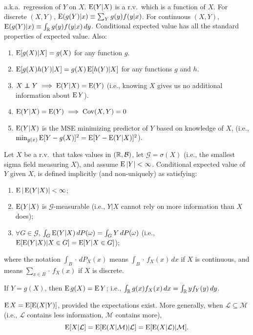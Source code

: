 \documentclass[8pt,letterpaper, landscape]{extarticle} %
\newcommand{\B}{\ensuremath{\mathcal{B}}}
\begin{document}
\begin{multicols}{3}
\begin{description}
 a.k.a.\ regression of $ Y $ on $ X $. $ \operatorname{E} (Y|X) $ is a r.v.\ which is a function of $ X $. For discrete $ (X,Y) $, $ \operatorname{E} (g(Y)|x) \equiv \sum_Y g(y) f(y|x) $. For continuous $ (X,Y) $, $ \operatorname{E} (g(Y)|x) \equiv \int_{\mathbb{R}} g(y) f(y|x) \, dy $. Conditional expected value has all the standard properties of expected value. Also:
\begin{enumerate}
\item $ \operatorname{E} [g(X) | X] = g(X) $ for any function $ g $.
\item $ \operatorname{E} [g(X) h(Y) | X] = g(X) \operatorname{E} [h(Y)|X] $ for any functions $ g $ and $ h $.
\item $ X \independent Y \implies \E (Y|X) = \E (Y) $ (i.e., knowing $ X $ gives us no additional information about $ \operatorname{E} Y $).
\item $ \operatorname{E} (Y|X) = \operatorname{E} (Y) \implies \operatorname{Cov} (X, Y) = 0  $
\item $ \operatorname{E} (Y|X) $ is the MSE minimizing predictor of $ Y $ based on knowledge of $ X $, (i.e., $ \min_{g(x)} \operatorname{E} [Y - g(X)]^{2} = \operatorname{E} [Y - \operatorname{E} (Y|X)]^{2} $).
\end{enumerate}
Let $ X $ be a r.v.\ that takes values in $ (\R, \B) $, let $ \mathcal{G} = \sigma (X) $ (i.e., the smallest sigma field measuring $ X $), and assume $ \operatorname{E} |Y| < \infty $. Conditional expected value of $ Y $ given $ X $, is defined implicitly (and non-uniquely) as satisfying:
\begin{enumerate}
\item $ \operatorname{E} | \operatorname{E} (Y|X) | < \infty $;
\item $ \operatorname{E} (Y|X) $ is $ \mathcal{G} $-measurable (i.e., $ Y|X $ cannot rely on more information than $ X $ does);
\item $ \forall G \in \mathcal{G} $, $ \int_G \operatorname{E} (Y|X) \, dP(\omega) = \int_G Y \, dP(\omega) $ (i.e., $ \operatorname{E} [ \operatorname{E} (Y|X) | X \in G] = \operatorname{E} [Y | X \in G ] $);
\end{enumerate}
where the notation $ \int_B \cdot \, dP_X(x) $ means $ \int_B  \cdot \, f_X(x) \, dx $ if $ X $ is continuous, and means $ \sum_{x \in B} \cdot \, f_X(x) $ if $ X $ is discrete.

 If $ Y = g(X) $, then $ \operatorname{E} g(X) = \operatorname{E} Y $; i.e., $ \int_{\mathbb{R}} g(x) f_X(x)\, dx = \int_{\mathbb{R}} y f_Y(y) \, dy $.

 $ \operatorname{E} X = \operatorname{E} [ \operatorname{E} (X|Y)] $, provided the expectations exist. More generally, when $ \mathcal{L} \subseteq \mathcal{M} $ (i.e., $ \mathcal{L} $ contains less information, $ \mathcal{M} $ contains more),
$$ \operatorname{E} [X | \mathcal{L} ] = \operatorname{E} [ \operatorname{E} (X | \mathcal{M} ) | \mathcal{L} ] = \operatorname{E} [ \operatorname{E} (X | \mathcal{L} ) | \mathcal{M} ] . $$


\end{description}
\end{multicols}
\end{document}
